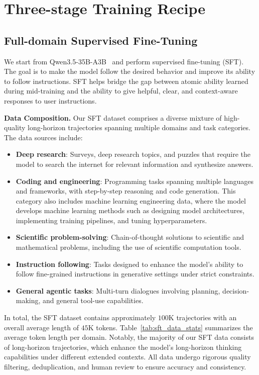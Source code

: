 \documentclass{llmxive}
\begin{document}
\section{Three-stage Training Recipe}

\subsection{Full-domain Supervised Fine-Tuning}
\label{sec:sft}

We start from Qwen3.5-35B-A3B~\citep{Qwen3.5} and perform supervised fine-tuning (SFT). The goal is to make the model follow the desired behavior and improve its ability to follow instructions. SFT helps bridge the gap between atomic ability learned during mid-training and the ability to give helpful, clear, and context-aware responses to user instructions.


\textbf{Data Composition.}
Our SFT dataset comprises a diverse mixture of high-quality long-horizon trajectories spanning multiple domains and task categories. The data sources include:
\begin{itemize}
    \item \textbf{Deep research}: Surveys, deep research topics, and puzzles that require the model to search the internet for relevant information and synthesize answers.
    \item \textbf{Coding and engineering}: Programming tasks spanning multiple languages and frameworks, with step-by-step reasoning and code generation. This category also includes machine learning engineering data, where the model develops machine learning methods such as designing model architectures, implementing training pipelines, and tuning hyperparameters.
    \item \textbf{Scientific problem-solving}: Chain-of-thought solutions to scientific and mathematical problems, including the use of scientific computation tools.
    \item \textbf{Instruction following}: Tasks designed to enhance the model's ability to follow fine-grained instructions in generative settings under strict constraints.
    \item \textbf{General agentic tasks}: Multi-turn dialogues involving planning, decision-making, and general tool-use capabilities.
\end{itemize}

In total, the SFT dataset contains approximately $100$K trajectories with an overall average length of $45$K tokens. Table~\ref{tab:sft_data_stats} summarizes the average token length per domain. Notably, the majority of our SFT data consists of long-horizon trajectories, which enhance the model's long-horizon thinking capabilities under different extended contexts. All data undergo rigorous quality filtering, deduplication, and human review to ensure accuracy and consistency.
\end{document}
